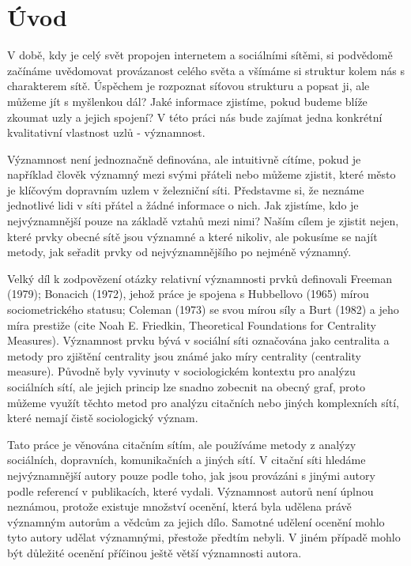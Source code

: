 \documentclass{bakalarka}
\begin{document}
\pagestyle{empty}
\tableofcontents

\pagestyle{fancy}
\chapter{Úvod}
V době, kdy je celý svět propojen internetem a sociálními sítěmi, si podvědomě
začínáme uvědomovat provázanost celého světa a všímáme si struktur kolem nás s
charakterem sítě. Úspěchem je rozpoznat síťovou strukturu a popsat ji, ale
můžeme jít s myšlenkou dál? Jaké informace zjistíme, pokud budeme blíže zkoumat
uzly a jejich spojení? V této práci nás bude zajímat jedna konkrétní
kvalitativní vlastnost uzlů - významnost.

Významnost není jednoznačně definována, ale intuitivně cítíme, pokud je
například člověk významný mezi svými přáteli nebo můžeme zjistit, které město
je klíčovým dopravním uzlem v železniční síti.  Představme si, že neznáme
jednotlivé lidi v síti přátel a žádné informace o nich. Jak zjistíme, kdo je
nejvýznamnější pouze na základě vztahů mezi nimi? Naším cílem je zjistit nejen,
které prvky obecné sítě jsou významné a které nikoliv, ale pokusíme se najít
metody, jak seřadit prvky od nejvýznamnějšího po nejméně významný.

Velký díl k zodpovězení otázky relativní významnosti prvků definovali Freeman
(1979); Bonacich (1972), jehož práce je spojena s Hubbellovo (1965) mírou
sociometrického statusu; Coleman (1973) se svou mírou síly a Burt (1982) a jeho
míra prestiže (cite Noah E. Friedkin, Theoretical Foundations for Centrality
Measures). Významnost prvku bývá v sociální síti označována jako centralita a
metody pro zjištění centrality jsou známé jako míry centrality (centrality
measure). Původně byly vyvinuty v sociologickém kontextu pro analýzu sociálních
sítí, ale jejich princip lze snadno zobecnit na obecný graf, proto můžeme
využít těchto metod pro analýzu citačních nebo jiných komplexních sítí, které
nemají čistě sociologický význam.

Tato práce je věnována citačním sítím, ale používáme metody z analýzy
sociálních, dopravních, komunikačních a jiných sítí. V citační síti hledáme
nejvýznamnější autory pouze podle toho, jak jsou provázáni s jinými autory
podle referencí v publikacích, které vydali. Významnost autorů není úplnou
neznámou, protože existuje množství ocenění, která byla udělena právě významným
autorům a vědcům za jejich dílo. Samotné udělení ocenění mohlo tyto autory
udělat významnými, přestože předtím nebyli. V jiném případě mohlo být důležité
ocenění příčinou ještě větší významnosti autora. 
\end{document}
